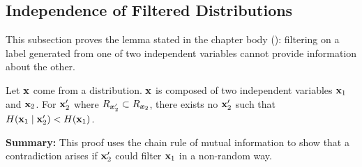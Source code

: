 \subsection{Independence of Filtered Distributions}
\label{app:filter}

This subsection proves the lemma stated in the chapter body (): filtering on a label generated from one of two independent variables cannot provide information about the other.

\begin{lemma}
Let ${\mathbf{x}}$ come from a distribution. ${\mathbf{x}}$ is composed of two independent variables ${\mathbf{x}}_1$ and ${\mathbf{x}}_2$. For ${\mathbf{x}}_2'$ where $R_{{\bm{x}}_2'} \subset R_{{\bm{x}}_2}$, there exists no ${\mathbf{x}}_2'$ such that $H({\mathbf{x}}_1 \mid {\mathbf{x}}_2') < H({\mathbf{x}}_1)$.
\label{filter}
\end{lemma}

\textbf{Summary:} This proof uses the chain rule of mutual information to show that a contradiction arises if ${\mathbf{x}}_2'$ could filter ${\mathbf{x}}_1$ in a non-random way.

